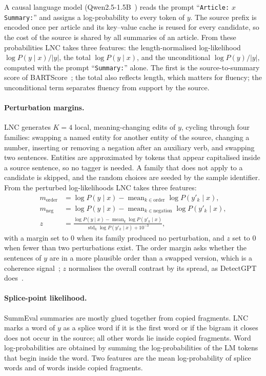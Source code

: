 A causal language model (Qwen2.5-1.5B~\citep{qwen2025report}) reads the prompt ``\texttt{Article:} $x$ \texttt{Summary:}'' and assigns a log-probability to every token of $y$. The source prefix is encoded once per article and its key--value cache is reused for every candidate, so the cost of the source is shared by all summaries of an article. From these probabilities LNC takes three features: the length-normalised log-likelihood $\log P(y\mid x)/|y|$, the total $\log P(y\mid x)$, and the unconditional $\log P(y)/|y|$, computed with the prompt ``\texttt{Summary:}'' alone. The first is the source-to-summary score of BARTScore~\citep{yuan2021bartscore}; the total also reflects length, which matters for fluency; the unconditional term separates fluency from support by the source.

\paragraph{Perturbation margins.} LNC generates $K=4$ local, meaning-changing edits of $y$, cycling through four families: swapping a named entity for another entity of the source, changing a number, inserting or removing a negation after an auxiliary verb, and swapping two sentences. Entities are approximated by tokens that appear capitalised inside a source sentence, so no tagger is needed. A family that does not apply to a candidate is skipped, and the random choices are seeded by the sample identifier. From the perturbed log-likelihoods LNC takes three features:
\begin{align}
m_{\mathrm{order}} &= \log P(y\mid x) - \operatorname{mean}_{k \in \mathrm{order}} \log P(y'_k\mid x), \\
m_{\mathrm{neg}} &= \log P(y\mid x) - \operatorname{mean}_{k \in \mathrm{negation}} \log P(y'_k\mid x), \\
z &= \frac{\log P(y\mid x) - \operatorname{mean}_k \log P(y'_k\mid x)}{\operatorname{std}_k \log P(y'_k\mid x) + 10^{-3}},
\end{align}
with a margin set to 0 when its family produced no perturbation, and $z$ set to 0 when fewer than two perturbations exist. The order margin asks whether the sentences of $y$ are in a more plausible order than a swapped version, which is a coherence signal~\citep{xie2023deltascore}; $z$ normalises the overall contrast by its spread, as DetectGPT does~\citep{mitchell2023detectgpt}.

\paragraph{Splice-point likelihood.} SummEval summaries are mostly glued together from copied fragments. LNC marks a word of $y$ as a splice word if it is the first word or if the bigram it closes does not occur in the source; all other words lie inside copied fragments. Word log-probabilities are obtained by summing the log-probabilities of the LM tokens that begin inside the word. Two features are the mean log-probability of splice words and of words inside copied fragments.

